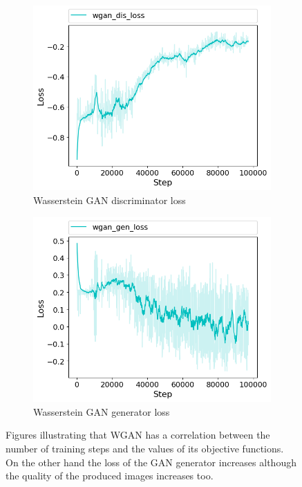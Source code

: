 \begin{figure}[h!]
  \begin{subfigure}[b]{0.5\textwidth}
    \includegraphics[width=\textwidth]{figures/ex/wgan_dis_loss}
    \caption{Wasserstein GAN discriminator loss}
    \label{fig:wgan_dis_loss}
  \end{subfigure}
  \hfill
  \begin{subfigure}[b]{0.5\textwidth}
    \includegraphics[width=\textwidth]{figures/ex/wgan_gen_loss}
    \caption{Wasserstein GAN generator loss}
    \label{fig:wgan_gen_loss}
  \end{subfigure}
  
  \caption{Figures illustrating that WGAN has a correlation between the number of training steps and the values of its objective functions. On the other hand the loss of the GAN generator increases although the quality of the produced images increases too.}
  \label{fig:losses}
\end{figure}
